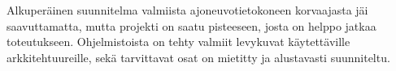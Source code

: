 Alkuperäinen suunnitelma valmiista ajoneuvotietokoneen korvaajasta jäi saavuttamatta, mutta projekti on saatu pisteeseen, josta on helppo jatkaa toteutukseen. Ohjelmistoista on tehty valmiit levykuvat käytettäville arkkitehtuureille, sekä tarvittavat osat on mietitty ja alustavasti suunniteltu.











